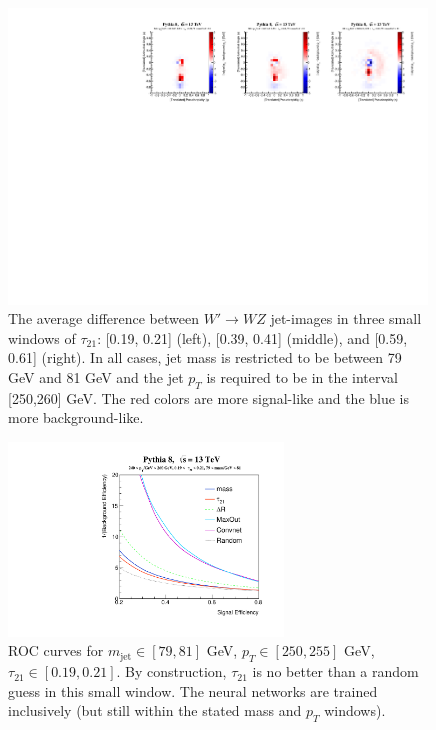 \begin{figure}[h!]
  \begin{center}
  
        \includegraphics[width=0.99\textwidth]{figures/difference_fixed_nonorm.pdf}
        
      \caption{
         The average difference between $W'\rightarrow WZ$ jet-images in three small windows of $\tau_{21}$: [0.19, 0.21] (left), [0.39, 0.41] (middle), and [0.59, 0.61] (right).  In all cases, jet mass is restricted to be between 79 GeV and 81 GeV and the jet $p_T$ is required to be in the interval [250,260] GeV.  The red colors are more signal-like and the blue is more background-like.
        \label{fig:meanImagesWindow2} 
      }
    \end{center}
\end{figure}  

\begin{figure}[h!]
  \centering
   \includegraphics[width=0.65\textwidth]{figures/ROC_small_window.pdf}
  \caption{ROC curves for $m_\text{jet}\in [79, 81]$ GeV, $p_{T}\in [250, 255]$ GeV, $\tau_{21}\in[0.19, 0.21]$. By construction, $\tau_{21}$ is no better than a random guess in this small window.  The neural networks are trained inclusively (but still within the stated mass and $p_T$ windows).}
  \label{fig:rocWindow}
\end{figure}

